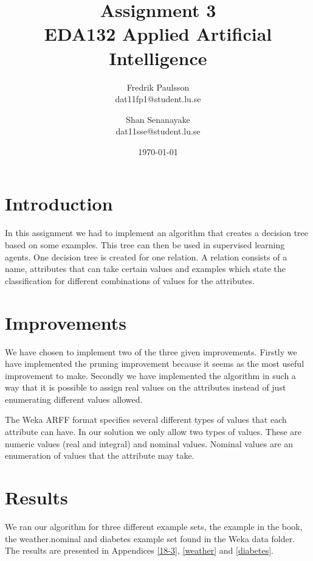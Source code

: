 \documentclass[a4paper]{article}
\title{Assignment 3 \\ EDA132 Applied Artificial Intelligence}
\date{\today}
\author{Fredrik Paulsson \\ dat11fp1@student.lu.se
\and Shan Senanayake \\ dat11sse@student.lu.se}
\begin{document}
\maketitle




\section{Introduction}
In this assignment we had to implement an algorithm that creates a decision tree based on some examples. This tree can then be used in supervised learning agents. One decision tree is created for one relation. A relation consists of a name, attributes that can take certain values and examples which state the classification for different combinations of values for the attributes.

\section{Improvements}
We have chosen to implement two of the three given improvements. Firstly we have implemented the pruning improvement because it seems as the most useful improvement to make. Secondly we have implemented the algorithm in such a way that it is possible to assign real values on the attributes instead of just enumerating different values allowed.

The Weka ARFF format specifies several different types of values that each attribute can have. In our solution we only allow two types of values. These are numeric values (real and integral) and nominal values. Nominal values are an enumeration of values that the attribute may take.

\section{Results}
We ran our algorithm for three different example sets, the example in the book, the weather.nominal and diabetes example set found in the Weka data folder. The results are presented in Appendices \ref{18-3}, \ref{weather} and \ref{diabetes}.
\end{document}
